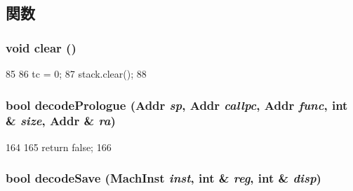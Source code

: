 \subsection{関数}
\hypertarget{classArmISA_1_1StackTrace_ac8bb3912a3ce86b15842e79d0b421204}{
\subsubsection[{clear}]{\setlength{\rightskip}{0pt plus 5cm}void clear ()}}
\label{classArmISA_1_1StackTrace_ac8bb3912a3ce86b15842e79d0b421204}



\begin{DoxyCode}
85     {
86         tc = 0;
87         stack.clear();
88     }
\end{DoxyCode}
\hypertarget{classArmISA_1_1StackTrace_a875eea16b2891accc8cbec7eb6c36003}{
\subsubsection[{decodePrologue}]{\setlength{\rightskip}{0pt plus 5cm}bool decodePrologue ({\bf Addr} {\em sp}, \/  {\bf Addr} {\em callpc}, \/  {\bf Addr} {\em func}, \/  int \& {\em size}, \/  {\bf Addr} \& {\em ra})}}
\label{classArmISA_1_1StackTrace_a875eea16b2891accc8cbec7eb6c36003}



\begin{DoxyCode}
164     {
165         return false;
166     }
\end{DoxyCode}
\hypertarget{classArmISA_1_1StackTrace_ae56dad5982b67d8717714c383b6a59f8}{
\subsubsection[{decodeSave}]{\setlength{\rightskip}{0pt plus 5cm}bool decodeSave ({\bf MachInst} {\em inst}, \/  int \& {\em reg}, \/  int \& {\em disp})}}
\label{classArmISA_1_1StackTrace_ae56dad5982b67d8717714c383b6a59f8}



